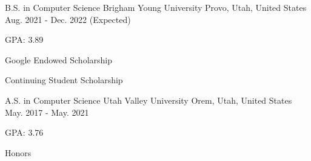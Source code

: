 

\begin{cventries}

  \cventry
    {B.S. in Computer Science} %
    {Brigham Young University} %
    {Provo, Utah, United States} %
    {Aug. 2021 - Dec. 2022 (Expected)} %
    {
      \begin{cvitems} %
        \item {GPA: 3.89}
        \item {Google Endowed Scholarship}
        \item {Continuing Student Scholarship}
      \end{cvitems}
    }
  
  \cventry
    {A.S. in Computer Science} %
    {Utah Valley University} %
    {Orem, Utah, United States} %
    {May. 2017 - May. 2021} %
    {
      \begin{cvitems} %
        \item {GPA: 3.76}
        \item {Honors}
      \end{cvitems}
    }

\end{cventries}
